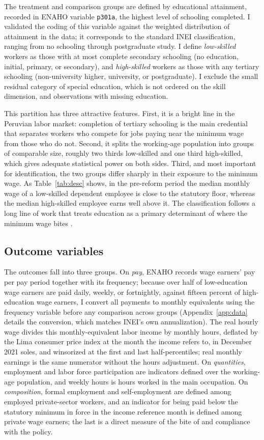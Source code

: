 The treatment and comparison groups are defined by educational attainment, recorded in ENAHO variable \texttt{p301a}, the highest level of schooling completed. I validated the coding of this variable against the weighted distribution of attainment in the data; it corresponds to the standard INEI classification, ranging from no schooling through postgraduate study. I define \emph{low-skilled} workers as those with at most complete secondary schooling (no education, initial, primary, or secondary), and \emph{high-skilled} workers as those with any tertiary schooling (non-university higher, university, or postgraduate). I exclude the small residual category of special education, which is not ordered on the skill dimension, and observations with missing education.

This partition has three attractive features. First, it is a bright line in the Peruvian labor market: completion of tertiary schooling is the main credential that separates workers who compete for jobs paying near the minimum wage from those who do not. Second, it splits the working-age population into groups of comparable size, roughly two thirds low-skilled and one third high-skilled, which gives adequate statistical power on both sides. Third, and most important for identification, the two groups differ sharply in their exposure to the minimum wage. As Table~\ref{tab:desc} shows, in the pre-reform period the median monthly wage of a low-skilled dependent employee is close to the statutory floor, whereas the median high-skilled employee earns well above it. The classification follows a long line of work that treats education as a primary determinant of where the minimum wage bites \citep{lemos_2009, katzkowicz_2021_uruguay}.

\subsection{Outcome variables}

The outcomes fall into three groups. On \emph{pay}, ENAHO records wage earners' pay per pay period together with its frequency; because over half of low-education wage earners are paid daily, weekly, or fortnightly, against fifteen percent of high-education wage earners, I convert all payments to monthly equivalents using the frequency variable before any comparison across groups (Appendix~\ref{app:data} details the conversion, which matches INEI's own annualization). The real hourly wage divides this monthly-equivalent labor income by monthly hours, deflated by the Lima consumer price index at the month the income refers to, in December 2021 soles, and winsorized at the first and last half-percentiles; real monthly earnings is the same numerator without the hours adjustment. On \emph{quantities}, employment and labor force participation are indicators defined over the working-age population, and weekly hours is hours worked in the main occupation. On \emph{composition}, formal employment and self-employment are defined among employed private-sector workers, and an indicator for being paid below the statutory minimum in force in the income reference month is defined among private wage earners; the last is a direct measure of the bite of and compliance with the policy.

